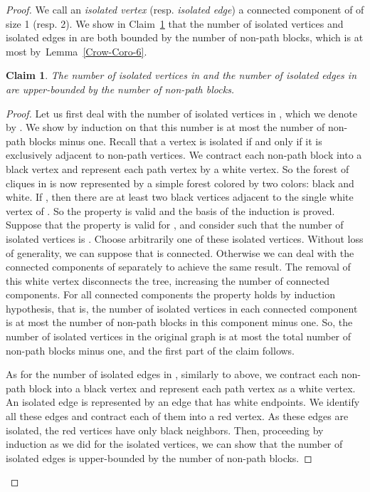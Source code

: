 \documentclass[
final
]{dmtcs-episciences}
\newtheorem{claimN}{Claim}{\bfseries}{\itshape}
\begin{document}
\begin{proof}
We call an {\it{isolated vertex}} (resp. \emph{isolated edge}) a connected component of  of size 1 (resp. 2).
We show in Claim~\ref{lemma4.8}  that the number of isolated vertices and isolated edges in  are both bounded by the number of non-path blocks, which is at most  by~Lemma~\ref{Crow-Coro-6}.

\begin{claimN}\label{lemma4.8}
The number of isolated vertices in  and the number of isolated edges in  are upper-bounded by the number of non-path blocks.	
	\end{claimN}
	\begin{proof}
	Let us first deal with the number of isolated vertices in , which we denote by . We show by induction on  that this number is at most the number of non-path blocks minus one. Recall that a vertex is isolated if and only if it is exclusively adjacent to non-path vertices. We contract each non-path block into a  black vertex and represent each path vertex by a white vertex. So the forest of cliques in  is now represented by a simple forest colored by two colors: black and white.
If , then there are at least two black vertices adjacent to the single white vertex of . So the property is valid and the basis of the induction is proved. Suppose that the property is valid for , and consider  such that the number of isolated vertices is . Choose arbitrarily one of these isolated vertices. Without loss of generality, we can suppose that  is connected. Otherwise we can deal with the connected components of  separately to achieve the same result. The removal of this white vertex disconnects the tree, increasing the number of connected components. For all connected components the property holds by induction hypothesis, that is, the number of isolated vertices in each connected component is at most the number of non-path blocks in this component minus one. So, the number of isolated vertices in the original graph is at most the total number of non-path blocks minus one, and the first part of the claim follows.

As for the number of isolated edges in , similarly to above,  we contract each non-path block into a black vertex and represent each path vertex as a white vertex. An isolated edge is represented by an edge that has white endpoints. We identify all these edges and contract each of them into a red vertex. As these edges are isolated,  the red vertices have only black neighbors. Then, proceeding by induction as we did for the isolated vertices, we can show that the number of isolated edges is upper-bounded by the number of non-path blocks.
	\end{proof}




\end{proof}
\end{document}
